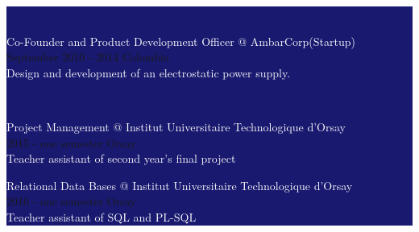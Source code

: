 \documentclass[letterpaper]{article}
\begin{document}
\begin{minipage}{1.\linewidth}
\colorbox{MidnightBlue}{
\begin{minipage}{0.47\linewidth} %
	\begin{minipage}{1\linewidth}
		\\
		\vspace{2ex}
		\begin{minipage}{0.9\linewidth}
			{\normalsize \textcolor{white}{Co-Founder and Product 
			Development Officer @ AmbarCorp(Startup)}}\\
			{\small\textcolor{gray!40}{September 2010 - 2014 \hfill Colombia}}\\
			{\small\textcolor{white}{Design and development of an electrostatic 
			power supply.}}\\
			\vspace{1ex}
		\end{minipage} 		
	\end{minipage}	
	\begin{minipage}{1\linewidth} %
		\\
		\vspace{2ex}
		\begin{minipage}{0.9\linewidth}
			{\normalsize \textcolor{white}{Project Management @ Institut 
			Universitaire Technologique d'Orsay}}\\
			{\small\textcolor{gray!40}{2015 - one semester \hfill Orsay}}\\
			{\small\textcolor{white}{Teacher assistant of second year's final 
			project}}\\			
		\end{minipage} 
		\begin{minipage}{0.9\linewidth}
			{\normalsize \textcolor{white}{Relational Data Bases @ Institut 
			Universitaire Technologique d'Orsay}}\\					
			{\small\textcolor{gray!40}{2016 - one semester \hfill Orsay}}\\
			{\small\textcolor{white}{Teacher assistant of SQL and 
			PL-SQL}}\\			
		\end{minipage} 

\end{minipage}
\end{minipage}}
\end{minipage}
\end{document}
